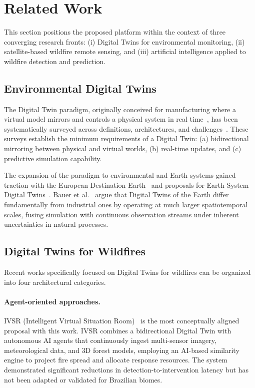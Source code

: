 \documentclass[preprint,12pt,times,numbers]{elsarticle}
\begin{document}
\section{Related Work}
\label{sec:related}

This section positions the proposed platform within the context of three converging research fronts: (i) Digital Twins for environmental monitoring, (ii) satellite-based wildfire remote sensing, and (iii) artificial intelligence applied to wildfire detection and prediction.

\subsection{Environmental Digital Twins}

The Digital Twin paradigm, originally conceived for manufacturing where a virtual model mirrors and controls a physical system in real time~\cite{article:grieves2014,article:tao2019}, has been systematically surveyed across definitions, architectures, and challenges~\cite{article:barricelli2019,article:rasheed2020,article:fuller2020,article:jones2020}. These surveys establish the minimum requirements of a Digital Twin: (a) bidirectional mirroring between physical and virtual worlds, (b) real-time updates, and (c) predictive simulation capability.

The expansion of the paradigm to environmental and Earth systems gained traction with the European Destination Earth~\cite{article:voosen2020} and proposals for Earth System Digital Twins~\cite{article:bauer2021nature,article:bauer2021natcc,article:nativi2021}. Bauer et al.~\cite{article:bauer2021natcc} argue that Digital Twins of the Earth differ fundamentally from industrial ones by operating at much larger spatiotemporal scales, fusing simulation with continuous observation streams under inherent uncertainties in natural processes.

\subsection{Digital Twins for Wildfires}

Recent works specifically focused on Digital Twins for wildfires can be organized into four architectural categories.

\paragraph{Agent-oriented approaches.} IVSR (Intelligent Virtual Situation Room)~\cite{article:morsali2026} is the most conceptually aligned proposal with this work. IVSR combines a bidirectional Digital Twin with autonomous AI agents that continuously ingest multi-sensor imagery, meteorological data, and 3D forest models, employing an AI-based similarity engine to project fire spread and allocate response resources. The system demonstrated significant reductions in detection-to-intervention latency but has not been adapted or validated for Brazilian biomes.
\end{document}

